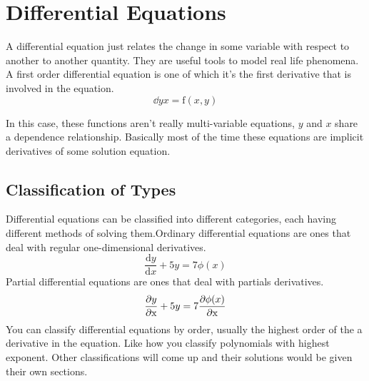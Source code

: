 \chapter{Differential Equations}
A differential equation just relates the change in some variable with respect to another to another quantity. They are useful tools to model real life phenomena. A first order differential equation is one of which it's the first derivative that is involved in the equation.
\begin{equation*}
	\dd{y}{x} = \mathrm{f}(x,y)
\end{equation*}

In this case, these functions aren't really multi-variable equations, $y$ and $x$ share a dependence relationship. Basically most of the time these equations are implicit derivatives of some solution equation.


\section{Classification of Types}
Differential equations can be classified into different categories, each having different methods of solving them.Ordinary differential equations are ones that deal with regular one-dimensional derivatives. 
\begin{equation*}
	\frac{\mathrm{d}y}{\mathrm{d}x} +5y = 7\phi(x) 
\end{equation*}
Partial differential equations are ones that deal with partials derivatives. 
\begin{equation*}
	\frac{\partial y}{\partial\mathrm{x}} +5y = 7\frac{\partial \phi(x)}{\partial\mathrm{x}} 
\end{equation*}
You can classify differential equations by order, usually the highest order of the a derivative in the equation. Like how you classify polynomials with highest exponent. Other classifications will come up and their solutions would be given their own sections.
